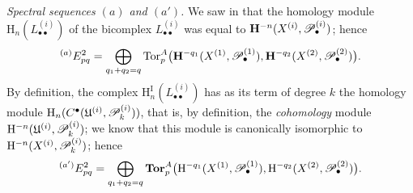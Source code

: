\begin{env}[6.6.3]
\label{III.6.6.3}
\emph{Spectral sequences $(a)$ and $(a')$.}
We saw in  that the homology module
$\mathrm H_n(L_{\bullet\bullet}^{(i)})$ of the bicomplex
$L_{\bullet\bullet}^{(i)}$ was equal to
$\mathbf{H}^{-n}(X^{(i)},\mathscr{P}_\bullet^{(i)})$; hence
\[
  {}^{(a)}E_{pq}^2
  =
  \bigoplus_{q_1+q_2=q}
  \operatorname{Tor}_p^A
  \bigl(
    \mathbf{H}^{-q_1}(X^{(1)},\mathscr{P}_\bullet^{(1)}),
    \mathbf{H}^{-q_2}(X^{(2)},\mathscr{P}_\bullet^{(2)})
  \bigr).
\]
By definition, the complex
$\mathrm H_n^{\mathrm I}(L_{\bullet\bullet}^{(i)})$ has as its term of degree $k$
the homology module
$\mathrm H_n(C^\bullet(\mathfrak U^{(i)},\mathscr{P}_k^{(i)}))$, that is,
by definition, the \emph{cohomology} module
$\mathrm{H}^{-n}(\mathfrak U^{(i)},\mathscr{P}_k^{(i)})$; we know  that
this module is canonically isomorphic to
$\mathrm{H}^{-n}(X^{(i)},\mathscr{P}_k^{(i)})$; hence
\[
  {}^{(a')}E_{pq}^2
  =
  \bigoplus_{q_1+q_2=q}
  \mathbf{Tor}_p^A
  \bigl(
    \mathrm{H}^{-q_1}(X^{(1)},\mathscr{P}_\bullet^{(1)}),
    \mathrm{H}^{-q_2}(X^{(2)},\mathscr{P}_\bullet^{(2)})
  \bigr).
\]
\end{env}

